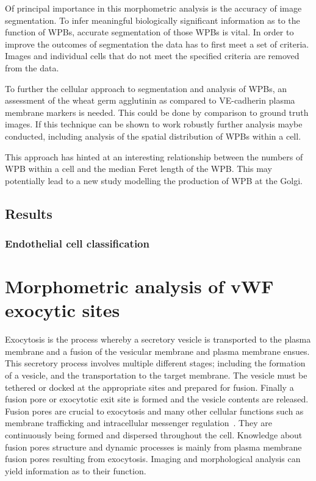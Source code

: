 Of principal importance in this morphometric analysis is the accuracy of image segmentation. To infer meaningful biologically significant information as to the function of WPBs, accurate segmentation of those WPBs is vital. In order to improve the outcomes of segmentation the data has to first meet a set of criteria. Images and individual cells that do not meet the specified criteria are removed from the data.

To further the cellular approach to segmentation and analysis of WPBs, an assessment of the wheat germ agglutinin as compared to VE-cadherin plasma membrane markers is needed. This could be done by comparison to ground truth images. If this technique can be shown to work robustly further analysis maybe conducted, including analysis of the spatial distribution of WPBs within a cell.

This approach has hinted at an interesting relationship between the numbers of WPB within a cell and the median Feret length of the WPB. This may potentially lead to a new study modelling the production of WPB at the Golgi.

\subsection{Results}
\subsubsection{Endothelial cell classification}

\section{Morphometric analysis of vWF exocytic sites}
Exocytosis is the process whereby a secretory vesicle is transported to the plasma membrane and a fusion of the vesicular membrane and plasma membrane ensues. This secretory process involves multiple different stages; including the formation of a vesicle, and the transportation to the target membrane. The vesicle must be tethered or docked at the appropriate sites and prepared for fusion. Finally a fusion pore or exocytotic exit site is formed and the vesicle contents are released. Fusion pores are crucial to exocytosis and many other cellular functions such as membrane trafficking and intracellular messenger regulation~\cite{Lindau2003}. They are continuously being formed and dispersed throughout the cell. Knowledge about fusion pores structure and dynamic processes is mainly from plasma membrane fusion pores resulting from exocytosis. Imaging and morphological analysis can yield information as to their function.

